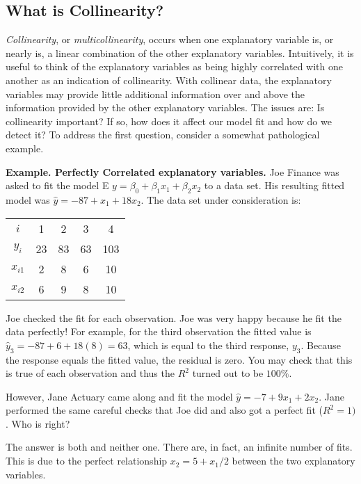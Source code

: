 \subsection{What is Collinearity?}

\textit{Collinearity}, or \textit{multicollinearity}, occurs when
one explanatory variable is, or nearly is, a linear combination of
the other explanatory variables. Intuitively, it is useful to think
of the explanatory variables as being highly correlated with one
another as an indication of collinearity. With collinear data, the
explanatory variables may provide little additional information over
and above the information provided by the other explanatory
variables. The issues are: Is collinearity important? If so, how
does it affect our model fit and how do we detect it? To address the
first question, consider a somewhat pathological example.

\linejed

\textbf{Example. Perfectly Correlated explanatory variables.} Joe
Finance was asked to fit the model E $y=\beta _{0}+\beta
_{1}x_{1}+\beta _{2}x_{2}$ to a data set. His resulting fitted model
was $\hat{y}=-87+x_{1}+18x_{2}.$  The data set under consideration
is:

\begin{center}
\begin{tabular}{ccccc}
\hline
$i$ & 1 & 2 & 3 & 4 \\
$y_{i}$ & 23 & 83 & 63 & 103 \\
$x_{i1}$ & 2 & 8 & 6 & 10 \\
$x_{i2}$ & 6 & 9 & 8 & 10 \\ \hline
\end{tabular}%
\end{center}

Joe checked the fit for each observation. Joe was very happy because
he fit the data perfectly! For example, for the third observation
the fitted value is $\hat{y}_{3}=-87+6+18(8)=63$, which is equal to
the third response, $y_{3} $. Because the response equals the fitted
value, the residual is zero. You may check that this is true of each
observation and thus the $R^{2}$ turned out to be $100\%$.

However, Jane Actuary came along and fit the model
$\hat{y}=-7+9x_{1}+2x_{2}.$ Jane performed the same careful checks
that Joe did and also got a perfect fit ($R^2 = 1)$. Who is right?

The answer is both and neither one. There are, in fact, an infinite
number of fits. This is due to the perfect relationship
$x_{2}=5+x_{1}/2$ between the two explanatory variables.

